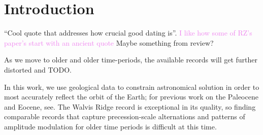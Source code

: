\documentclass[draft]{agujournal2019}
\newcommand{\ijk}{\textcolor{violet}}
\begin{document}
%
%
%
%





\section{Introduction}\label{sec:intro}

``Cool quote that addresses how crucial good dating is''.
\ijk{I like how some of RZ's paper's start with an ancient quote}
Maybe something from  review?

As we move to older and older time-periods, the available records will get further distorted and TODO.

In this work, we use geological data to constrain astronomical solution in order to most accurately reflect the orbit of the Earth; for previous work on the Paleocene and Eocene, see.
The Walvis Ridge record is exceptional in its quality, so finding comparable records that capture precession-scale alternations and patterns of amplitude modulation for older time periods is difficult at this time.
\end{document}
